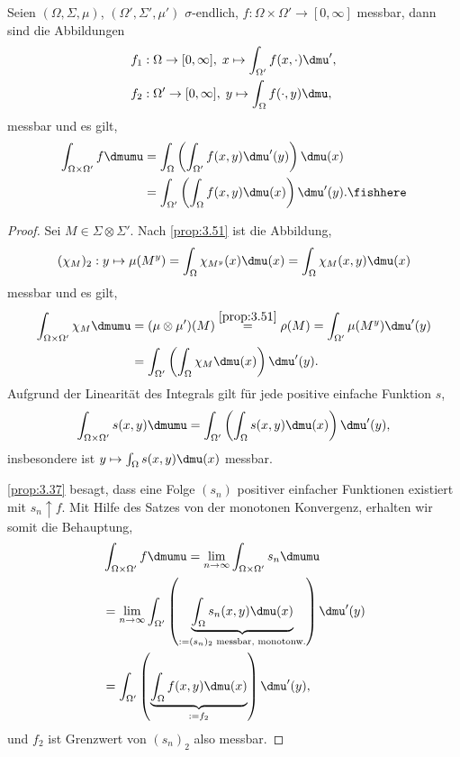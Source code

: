 \begin{prop}
\label{prop:3.52}
Seien $(\Omega,\Sigma,\mu)$, $(\Omega',\Sigma',\mu')$ $\sigma$-endlich,
$f:\Omega\times\Omega' \to [0,\infty]$ messbar, dann sind die Abbildungen
\begin{align*}
&f_1: \Omega\to[0,\infty],\; x\mapsto \int_{\Omega'} f(x,\cdot)\dmu',\\
&f_2: \Omega'\to[0,\infty],\; y\mapsto \int_\Omega f(\cdot,y)\dmu,
\end{align*}
messbar und es gilt,
\begin{align*}
\int_{\Omega\times\Omega'} f\dmumu &= \int_\Omega\left(
\int_{\Omega'} f(x,y) \dmu'(y)
\right) \dmu(x) \\ &= \int_{\Omega'} \left(\int_{\Omega} f(x,y) \dmu(x)
\right)\dmu'(y).\fishhere
\end{align*}
\end{prop}
\begin{proof}
Sei $M\in\Sigma\otimes\Sigma'$. Nach \ref{prop:3.51} ist die Abbildung,
\begin{align*}
(\chi_{M})_2: y\mapsto \mu(M^y) =
\int_\Omega \chi_{M^y}(x)\dmu(x) = \int_\Omega \chi_M(x,y)\dmu(x)
\end{align*}
messbar und es gilt,
\begin{align*}
\int_{\Omega\times\Omega'} \chi_M \dmumu
&= (\mu\otimes\mu')(M) \overset{\ref{prop:3.51}}{=} \rho(M)
= \int_{\Omega'} \mu(M^y) \dmu'(y)
\\ &= \int_{\Omega'} \left(
\int_\Omega \chi_M \dmu(x)
\right) \dmu'(y).
\end{align*}
Aufgrund der Linearität des Integrals gilt für jede positive einfache
Funktion $s$,
\begin{align*}
\int_{\Omega\times\Omega'} s(x,y)\dmumu
= \int_{\Omega'}\left(\int_\Omega s(x,y)\dmu(x) \right)\dmu'(y), 
\end{align*}
insbesondere ist $y\mapsto \int_\Omega s(x,y)\dmu(x)$ messbar.

\ref{prop:3.37} besagt, dass eine Folge $(s_n)$ positiver einfacher
Funktionen existiert mit $s_n\uparrow f$. Mit Hilfe des Satzes von der
monotonen Konvergenz, erhalten wir somit die Behauptung,
\begin{align*}
&\int_{\Omega\times\Omega'} f\dmumu = \lim\limits_{n\to\infty}
\int_{\Omega\times\Omega'} s_n \dmumu
\\ &= \lim\limits_{n\to\infty} \int_{\Omega'} \left(
\underbrace{\int_\Omega s_n(x,y) \dmu(x)}_{:=(s_n)_2 \text{ messbar,
monotonw.}} \right) \dmu'(y) \\ &= \int_{\Omega'} \left(
\underbrace{\int_\Omega f(x,y) \dmu(x)}_{:=f_2} \right) \dmu'(y),
\end{align*}
und $f_2$ ist Grenzwert von $(s_n)_2$ also messbar.\qedhere
\end{proof}

